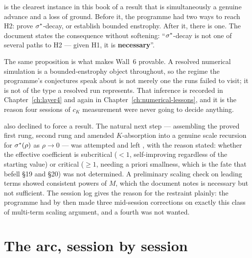 \begin{obsv}
\label{obs:regime-a-cost}
 is the clearest instance in this book of a result that is
simultaneously a genuine advance and a loss of ground. Before it, the
programme had two ways to reach H2: prove \(\sigma^{*}\)-decay, or establish
bounded enstrophy. After it, there is one. The document states the consequence
without softening: ``\(\sigma^{*}\)-decay is not one of several paths to H2 ---
given H1, it is \textbf{necessary}''.

\smallskip
The same proposition is what makes Wall~6 provable. A resolved numerical
simulation is a bounded-enstrophy object throughout, so the regime the
programme's conjectures speak about is not merely one the runs failed to
visit; it is not of the type a resolved run represents. That inference is
recorded in Chapter~\ref{ch:layer4} and again in
Chapter~\ref{ch:numerical-lessons}, and it is the reason four sessions of
\(c_K\) measurement were never going to decide anything.
\end{obsv}

 also declined to force a result. The natural next step --- assembling
the proved first rung, second rung and amended \(K\)-absorption into a genuine
scale recursion for \(\sigma^{*}(\rho)\) as \(\rho\to0\) --- was attempted and left
\OPEN{}, with the reason stated: whether the effective coefficient is
subcritical (\(<1\), self-improving regardless of the starting value) or
critical (\(\ge1\), needing a priori smallness, which is the fate that
befell \S19 and \S20) was not determined. A preliminary scaling check on
leading terms showed consistent powers of \(M\), which the document notes is
necessary but not sufficient. The session log gives the reason for the
restraint plainly: the programme had by then made three mid-session
corrections on exactly this class of multi-term scaling argument, and a fourth
was not wanted.

\section{The arc, session by session}
\label{sec:pincer-ledger}

